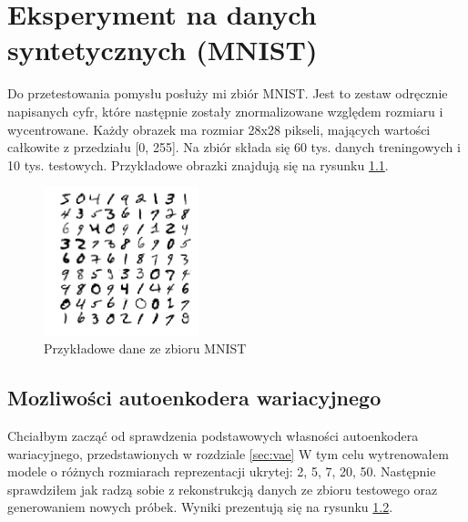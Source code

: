 \chapter{Eksperyment na danych syntetycznych (MNIST)}

Do przetestowania pomysłu posłuży mi zbiór MNIST. Jest to zestaw odręcznie napisanych cyfr, które następnie zostały znormalizowane względem rozmiaru i wycentrowane. Każdy obrazek ma rozmiar 28x28 pikseli, mających wartości całkowite z przedziału [0, 255]. Na zbiór składa się 60 tys. danych treningowych i 10 tys. testowych. Przykładowe obrazki znajdują się na rysunku \ref{fig:mnist}.

\begin{figure}[h!]
    \centering
    \includegraphics[width=0.4\textwidth]{images/mnist_v2}
    \caption{Przykładowe dane ze zbioru MNIST}
    \label{fig:mnist}
\end{figure}

\section{Mozliwości autoenkodera wariacyjnego} \label{sec:vae_oppo}

Chciałbym zacząć od sprawdzenia podstawowych własności autoenkodera wariacyjnego, przedstawionych w rozdziale \ref{sec:vae} W tym celu wytrenowałem modele o różnych rozmiarach reprezentacji ukrytej: 2, 5, 7, 20, 50. Następnie sprawdziłem jak radzą sobie z rekonstrukcją danych ze zbioru testowego oraz generowaniem nowych próbek. Wyniki prezentują się na rysunku \ref{fig:mnist_recon}. 

\begin{figure}[h!]
  \centering
  \begin{subfigure}[b]{0.45\linewidth}
    \caption{}
  \end{subfigure}
  \begin{subfigure}[b]{0.45\linewidth}
    \caption{}
  \end{subfigure}
  \begin{subfigure}[b]{0.45\linewidth}
    \caption{}
  \end{subfigure}
  \caption{}
  \label{fig:mnist_recon}
\end{figure}

